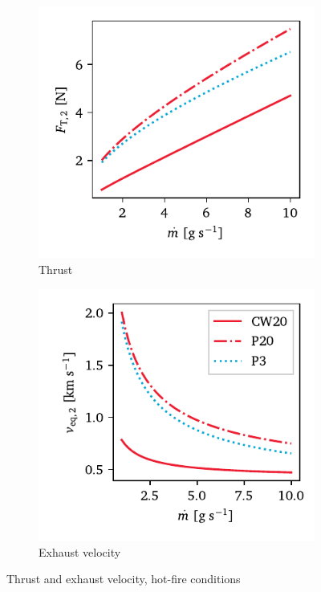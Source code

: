             \begin{figure}[h]
                \centering
                \begin{subfigure}[t]{0.48\textwidth}
                    \centering
                    \includegraphics[width=\textwidth]{assets/4 models/thrust_hotThrust.pdf}
                    \caption{Thrust}
                    \label{fig:thruster_perf_thrust}
                \end{subfigure}
                \hfill
                \begin{subfigure}[t]{0.48\textwidth}
                    \centering
                    \includegraphics[width=\textwidth]{assets/4 models/ve_hotThrust.pdf}
                    \caption{Exhaust velocity}
                    \label{fig:thruster_perf_ve}
                \end{subfigure}
                \caption{Thrust and exhaust velocity, hot-fire conditions}
                \label{fig:thruster_perf}
            \end{figure}

